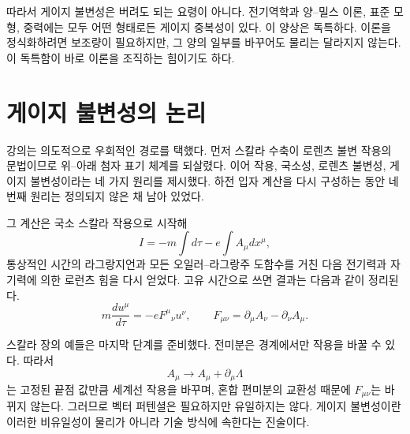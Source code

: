 \begin{classroomqa}\end{classroomqa}

\begin{classroomqa}\end{classroomqa}

따라서 게이지 불변성은 버려도 되는 요령이 아니다. 전기역학과 양--밀스 이론, 표준 모형, 중력에는 모두 어떤 형태로든 게이지 중복성이 있다. 이 양상은 독특하다. 이론을 정식화하려면 보조량이 필요하지만, 그 양의 일부를 바꾸어도 물리는 달라지지 않는다. 이 독특함이 바로 이론을 조직하는 힘이기도 하다.

\section{게이지 불변성의 논리}

강의는 의도적으로 우회적인 경로를 택했다. 먼저 스칼라 수축이 로렌츠 불변 작용의 문법이므로 위--아래 첨자 표기 체계를 되살렸다. 이어 작용, 국소성, 로렌츠 불변성, 게이지 불변성이라는 네 가지 원리를 제시했다. 하전 입자 계산을 다시 구성하는 동안 네 번째 원리는 정의되지 않은 채 남아 있었다.

그 계산은 국소 스칼라 작용으로 시작해
\begin{equation}
I
=
-m\int d\tau
-e\int A_\mu dx^\mu,
\end{equation}
통상적인 시간의 라그랑지언과 모든 오일러--라그랑주 도함수를 거친 다음 전기력과 자기력에 의한 로런츠 힘을 다시 얻었다. 고유 시간으로 쓰면 결과는 다음과 같이 정리된다.
\begin{equation}
m\frac{du^\mu}{d\tau}
=
-eF^\mu{}_\nu u^\nu,
\qquad
F_{\mu\nu}
=
\partial_\mu A_\nu-\partial_\nu A_\mu.
\end{equation}

스칼라 장의 예들은 마지막 단계를 준비했다. 전미분은 경계에서만 작용을 바꿀 수 있다. 따라서
\begin{equation}
A_\mu\longrightarrow A_\mu+\partial_\mu\Lambda
\end{equation}
는 고정된 끝점 값만큼 세계선 작용을 바꾸며, 혼합 편미분의 교환성 때문에 \(F_{\mu\nu}\)는 바뀌지 않는다. 그러므로 벡터 퍼텐셜은 필요하지만 유일하지는 않다. 게이지 불변성이란 이러한 비유일성이 물리가 아니라 기술 방식에 속한다는 진술이다.
